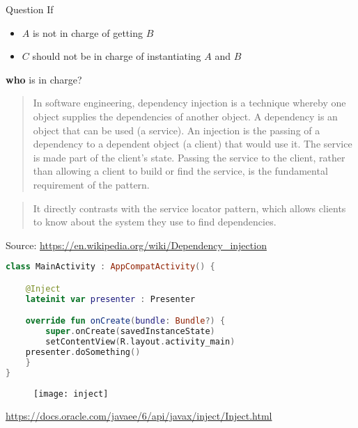 \documentclass[10pt]{beamer}
\begin{document}
\begin{frame}[fragile]
	
\begin{frame}[fragile]
	\begin{alertblock}{Question}
If 
		\begin{itemize}
			\item $A$ is not in charge of getting $B$
			\item $C$ should not be in charge of instantiating $A$ and $B$  
		\end{itemize}
		\textbf{who} is in charge?
	\end{alertblock}

\end{frame}
\begin{frame}[fragile]
	\begin{quotation}
		In software engineering, dependency injection is a technique whereby one object supplies the dependencies of another object. A dependency is an object that can be used (a service). An injection is the passing of a dependency to a dependent object (a client) that would use it. The service is made part of the client's state. Passing the service to the client, rather than allowing a client to build or find the service, is the fundamental requirement of the pattern.
	\end{quotation}
	\begin{quotation}
		It directly contrasts with the service locator pattern, which allows clients to know about the system they use to find dependencies.
	\end{quotation}
	Source: \url{https://en.wikipedia.org/wiki/Dependency_injection}
\end{frame}
\begin{lstlisting}[language=Kotlin, basicstyle=\ttfamily]
class MainActivity : AppCompatActivity() {

    @Inject
    lateinit var presenter : Presenter

    override fun onCreate(bundle: Bundle?) {
        super.onCreate(savedInstanceState)
        setContentView(R.layout.activity_main)
	presenter.doSomething()
    }
}
\end{lstlisting} 
\end{frame}

\begin{frame}[fragile]
	\begin{figure}
		\centering
		\texttt{[image: inject]}
	\end{figure}
	\url{https://docs.oracle.com/javaee/6/api/javax/inject/Inject.html}
\end{frame}
\end{document}
